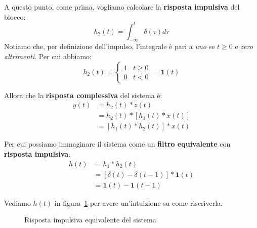 A questo punto, come prima, vogliamo calcolare la \textbf{risposta impulsiva}
del blocco:
\[
    h_{2}(t) = \int_{-\infty}^t \delta(\tau ) d \tau 
\]
Notiamo che, per definizione dell'impulso, l'integrale è pari a \textit{uno} 
se $t\ge 0$ e \textit{zero altrimenti}.
Per cui abbiamo:
\[
    h_{2}(t) = \begin{cases}
        1 & t\ge 0 \\ 
        0 & t < 0
    \end{cases} = \mathbf{1}(t)
\]


Allora che la \textbf{risposta complessiva} del sistema è:
\[
    \begin{aligned}
        y(t) &= h_{2}(t) \ast z(t) \\ 
             &= h_{2}(t) \ast [ h_{1}(t) \ast x(t)] \\ 
             &= [h_{1}(t) \ast h_{2}(t)] \ast x(t)
    \end{aligned}
\]

Per cui possiamo immaginare il sistema come un \textbf{filtro equivalente}
con \textbf{risposta impulsiva}:
\[
    \begin{aligned}
        h(t) &= h_{1} \ast h_{2}(t) \\ 
             &= [\delta(t) - \delta(t-1)] \ast \mathbf{1}(t) \\ 
             &= \mathbf{1}(t) - \mathbf{1}(t-1)
    \end{aligned}
\]

Vediamo $h(t)$ in figura~\ref{fig:Es_01_04_Esercizio1_RispostaImpulsivaEquivalente}
per avere un'intuizione su come riscriverla.

\begin{figure}[!ht]
    \centering
    \caption{Risposta impulsiva equivalente del sistema}
    \label{fig:Es_01_04_Esercizio1_RispostaImpulsivaEquivalente}
\end{figure}


